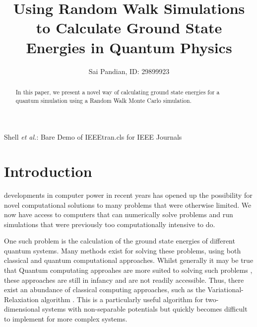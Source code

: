 \documentclass[journal]{IEEEtran}
\begin{document}
\title{Using Random Walk Simulations to Calculate Ground State Energies in
  Quantum Physics}

\author{Sai Pandian, ID: 29899923}%
        
{Shell \MakeLowercase{\textit{et al.}}: Bare Demo of IEEEtran.cls for IEEE Journals}

\maketitle

\begin{abstract}
  In this paper, we present a novel way of calculating ground state energies for
  a quantum simulation using a Random Walk Monte Carlo simulation.
\end{abstract}


\section{Introduction}
 developments in computer power in recent years has opened
up the possibility for novel computational solutions to many problems that were
otherwise limited. We now have access to computers that can numerically solve
problems and run simulations that were previously too computationally intensive
to do.

One such problem is the calculation of the ground state energies of different
quantum systems. Many methods exist for solving these problems, using both
classical and quantum computational approaches. Whilst generally it may be true
that Quantum computating approahes are more suited to solving such problems
\cite{Mazzola}, these approaches are still in infancy and are not readily
accessible. Thus, there exist an abundance of classical computing approaches,
such as the Variational-Relaxiation algorithm \cite{Schroeder2017}. This is a
particularly useful algorithm for two-dimensional systems with non-separable
potentials but quickly becomes difficult to implement for more complex systems.
\end{document}
